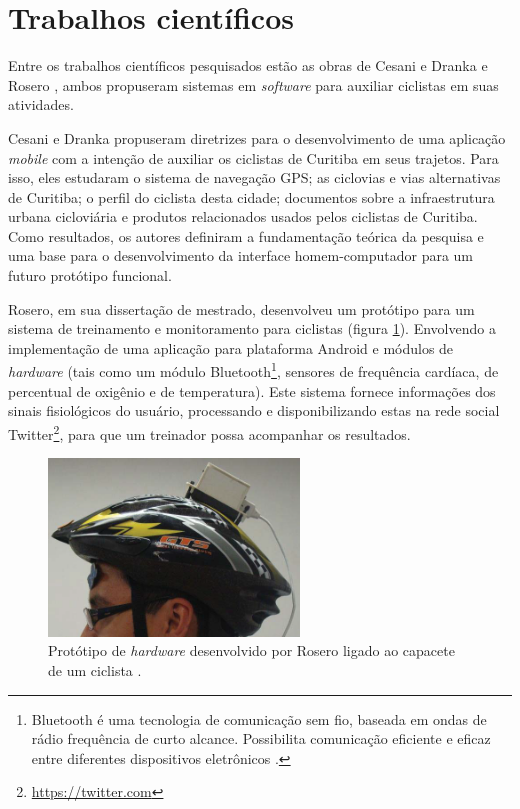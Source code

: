 \section{Trabalhos científicos}
Entre os trabalhos científicos pesquisados estão as obras de Cesani e Dranka \citeyearpar{cesani2013} e Rosero \citeyearpar{gaidos2012}, ambos propuseram sistemas em \textit{software} para auxiliar ciclistas em suas atividades. \par

Cesani e Dranka propuseram diretrizes para o desenvolvimento de uma aplicação \textit{mobile} com a intenção de auxiliar os ciclistas de Curitiba em seus trajetos. Para isso, eles estudaram o sistema de navegação GPS; as ciclovias e vias alternativas de Curitiba; o perfil do ciclista desta cidade; documentos sobre a infraestrutura urbana cicloviária e produtos relacionados usados pelos ciclistas de Curitiba. Como resultados, os autores definiram a fundamentação teórica da pesquisa e uma base para o desenvolvimento da interface homem-computador para um futuro protótipo funcional. \par

Rosero, em sua dissertação de mestrado, desenvolveu um protótipo para um sistema de treinamento e monitoramento para ciclistas (figura \ref{fig:rosero}). Envolvendo a implementação de uma aplicação para plataforma Android e módulos de \textit{hardware} (tais como um módulo Bluetooth\footnote{Bluetooth é uma tecnologia de comunicação sem fio, baseada em ondas de rádio frequência de curto alcance. Possibilita comunicação eficiente e eficaz entre diferentes dispositivos eletrônicos \cite{gaidos2012}.}, sensores de frequência cardíaca, de percentual de oxigênio e de temperatura). Este sistema fornece informações dos sinais fisiológicos do usuário, processando e disponibilizando estas na rede social Twitter\footnote{\url{https://twitter.com}}, para que um treinador possa acompanhar os resultados.

\begin{figure}[hb]
    \caption[Protótipo de \textit{hardware} desenvolvido por Rosero ligado ao capacete de um ciclista]{Protótipo de \textit{hardware} desenvolvido por Rosero ligado ao capacete de um ciclista \cite{gaidos2012}.}
    \centerline{\includegraphics[width=18em]{figuras/rosero.png}}
    \label{fig:rosero}
\end{figure}